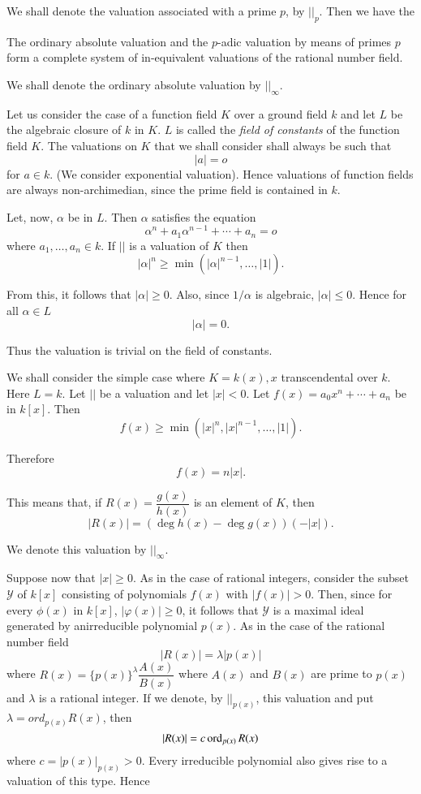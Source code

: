 We shall denote the valuation associated with a prime $p$, by $|
|_p$. Then we have the  

\begin{thm}\label{chap8:thm2}%
 The ordinary absolute valuation and the $p$-adic valuation by
  means of primes $p$ form a complete system of in-equivalent
  valuations of the rational number field. 
\end{thm}

We shall denote the ordinary absolute valuation by $| |_\infty$. 

Let us consider the case of a function field $K$ over a ground field
$k$ and let $L$ be the algebraic closure of $k$ in $K$. $L$ is called
the \textit{field of constants} of the function field $K$. The\pageoriginale
valuations on $K$ that we shall consider shall always be such that 
$$
|a| = o
$$
for $a \in k$. (We consider exponential valuation). Hence valuations
of function fields are always non-archimedian, since the prime field
is contained in $k$. 

Let, now, $\alpha$ be in $L$. Then $\alpha$ satisfies the equation 
$$
\alpha^n + a_1 \alpha^{n-1} + \cdots + a_n = o
$$
where $a_1 , \ldots , a_n \in k$. If $||$ is a valuation of $K$ then 
$$
|\alpha|^n \ge \min (|\alpha|^{n-1}, \ldots , |1|) .
$$

From this, it follows that $|\alpha| \ge 0$. Also, since $1/ \alpha$
is algebraic, $|\alpha| \le 0$. Hence for all $\alpha \in L$  
$$
|\alpha| = 0 .
$$

Thus the valuation is trivial on the field of constants. 

We shall consider the simple case where $K = k(x), x$ transcendental
over $k$. Here $L = k$. Let $| |$ be a valuation and let $|x| <
0$. Let $f(x) = a_0 x^n + \cdots + a_n$ be in $k[x]$. Then 
$$
f(x) \ge \min (|x|^n , |x|^{n-1}, \ldots , |1|).
$$

Therefore
$$
f(x) = n |x| .
$$

This means that, if $R(x) = \dfrac{g(x)} {h(x)}$ is an element of $K$,
then  
$$
|R(x)| = (\deg h(x) - \deg g(x)) (- |x|) .
$$

We denote this valuation by $| |_\infty$.

Suppose now that $|x| \ge 0$. As in the case of rational integers,
consider the subset $\mathscr{Y}$ of $k[x]$ consisting of polynomials
$f(x)$ with $|f(x)| > 0$. Then, since for every $\phi(x)$ in $k[x]$,
$|\varphi(x)| \ge 0$, it follows that $\mathscr{Y}$ is a maximal ideal
generated by an\pageoriginale irreducible polynomial $p(x)$. As in the
case of the rational number field  
$$
|R(x)| = \lambda |p(x)| 
$$
where $R(x) = \{ p(x)\}^\lambda \dfrac{A(x)} {B(x)}$ where $A(x)$ and
$B(x)$ are prime to $p(x)$ and $\lambda$ is a rational integer. If we
denote, by $| |_{p(x)}$, this valuation and put $\lambda = ord_{p(x)}
R(x)$, then 
$$
|R(x)| = c \operatorname{ord}_{p(x)} R(x)
$$
where $c = |p(x)|_{p(x)} > 0$. Every irreducible polynomial also gives
rise to a valuation of this type. Hence 


